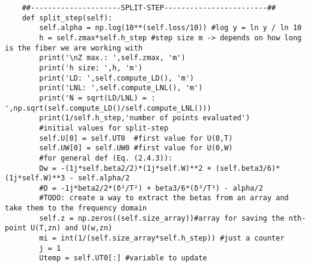 \begin{verbatim}
    ##---------------------SPLIT-STEP------------------------##
    def split_step(self):
        self.alpha = np.log(10**(self.loss/10)) #log y = ln y / ln 10 
        h = self.zmax*self.h_step #step size m -> depends on how long is the fiber we are working with
        print('\nZ max.: ',self.zmax, 'm')
        print('h size: ',h, 'm')
        print('LD: ',self.compute_LD(), 'm')
        print('LNL: ',self.compute_LNL(), 'm')
        print('N = sqrt(LD/LNL) = : ',np.sqrt(self.compute_LD()/self.compute_LNL()))
        print(1/self.h_step,'number of points evaluated')
        #initial values for split-step
        self.U[0] = self.UT0  #first value for U(0,T)  
        self.UW[0] = self.UW0 #first value for U(0,W)  
        #for general def (Eq. (2.4.3)): 
        Dw = -(1j*self.beta2/2)*(1j*self.W)**2 + (self.beta3/6)*(1j*self.W)**3 - self.alpha/2 
        #D = -1j*beta2/2*(δ²/T²) + beta3/6*(δ³/T³) - alpha/2
        #TODO: create a way to extract the betas from an array and take them to the frequency domain
        self.z = np.zeros((self.size_array))#array for saving the nth-point U(T,zn) and U(w,zn)
        mi = int(1/(self.size_array*self.h_step)) #just a counter 
        j = 1
        Utemp = self.UT0[:] #variable to update


\end{verbatim}
